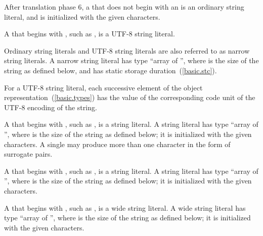 \pnum
{}%
%
After translation phase 6, a  that does not begin with an  is an ordinary string literal, and is initialized with the given characters.

\pnum
A  that begins with , such as , is a UTF-8 string literal.

\pnum
Ordinary string literals and UTF-8 string literals are
also referred to as narrow
string literals. A narrow string literal has type
%
``array of  '', where  is the size of
the string as defined below, and has static storage
duration~(\ref{basic.stc}).

\pnum
For a UTF-8 string literal, each successive element of the object
representation~(\ref{basic.types}) has the value of the corresponding
code unit of the UTF-8 encoding of the string.

\pnum
{}%
A  that begins with , such as , is
a  string literal. A  string literal has
type ``array of  '', where  is the
size of the string as defined below; it
is initialized with the given characters. A single  may
produce more than one  character in the form of
surrogate pairs.

\pnum
{}%
A  that begins with , such as , is
a  string literal. A  string literal has
type ``array of  '', where  is the
size of the string as defined below; it
is initialized with the given characters.

\pnum
{}%
A  that begins with
,
such as ,
is a wide string literal.
%
%
%
%
A wide string literal has type ``array of  '', where  is the size of the string as defined below; it
is initialized with the given characters.

